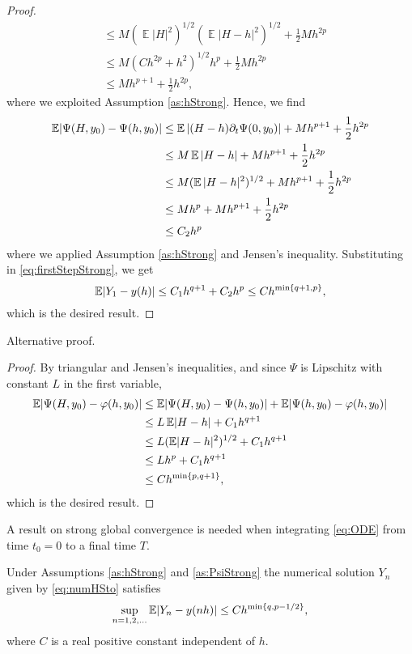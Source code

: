 \documentclass{siamart1116}
\numberwithin{theorem}{section}
\DeclarePairedDelimiter{\abs}{\lvert}{\rvert}
\renewcommand{\phi}{\varphi}
\newcommand{\E}{\operatorname{\mathbb{E}}}
\begin{document}
\begin{proof}
\begin{equation}
\begin{aligned}
	&\leq M (\E|H|^2)^{1/2}(\E|H-h|^2)^{1/2} + \frac{1}{2}Mh^{2p}\\
	&\leq M(Ch^{2p} + h^2)^{1/2}h^p + \frac{1}{2}Mh^{2p}\\
	&\leq M h^{p+1} + \frac{1}{2}h^{2p},
	\end{aligned} 
	\end{equation}
	where we exploited Assumption \ref{as:hStrong}. Hence, we find 
	\begin{equation}
	\begin{aligned}
	\E\abs{\Psi(H, y_0) - \Psi(h, y_0)} &\leq \E|(H-h)\partial_t{\Psi} (0, y_0)| + M h^{p+1} + \frac{1}{2}h^{2p} \\
	&\leq M\E|H - h| +  M h^{p+1} + \frac{1}{2}h^{2p}\\
	&\leq M(\E|H-h|^2)^{1/2} +  M h^{p+1} + \frac{1}{2}h^{2p} \\
	&\leq Mh^p + M h^{p+1} + \frac{1}{2}h^{2p} \\
	&\leq C_2 h^p
	\end{aligned}
	\end{equation}
	where we applied Assumption \ref{as:hStrong} and Jensen's inequality. Substituting in \eqref{eq:firstStepStrong}, we get
	\begin{equation}
	\E\abs{Y_1 - y(h)} \leq C_1h^{q+1} + C_2 h^{p} \leq Ch^{\min\{q+1, p\}},
	\end{equation}
	which is the desired result.
\end{proof}
\noindent Alternative proof.
\begin{proof}
	By triangular and Jensen's inequalities, and since $\Psi$ is Lipschitz with constant $L$ in the first variable,
	\begin{equation}
	\begin{aligned}
		\E\abs{\Psi(H, y_0) - \phi(h, y_0)} &\leq \E\abs{\Psi(H, y_0) - \Psi(h, y_0)} + \E\abs{\Psi(h, y_0) - \phi(h, y_0)} \\
		&\leq L \E\abs{H - h} + C_1 h^{q+1} \\
		&\leq L (\E\abs{H - h}^{2})^{1/2} + C_1 h^{q+1}\\
		&\leq L h^p + C_1 h^{q+1} \\
		&\leq C h^{\min\{p, q+1\}},
	\end{aligned}
	\end{equation}
	which is the desired result.
\end{proof}
\noindent A result on strong global convergence is needed when integrating \eqref{eq:ODE} from time $t_0 = 0$ to a final time $T$.
\begin{theorem}\label{thm:StrongOrder} Under Assumptions \ref{as:hStrong} and \ref{as:PsiStrong} the numerical solution $Y_n$ given by \eqref{eq:numHSto} satisfies 
	\begin{equation}\label{eq:StrongGlobalClaim}
	\sup_{n=1,2, \ldots} \E\abs{Y_n - y(nh)} \leq C h^{\min\{q, p-1/2\}},
	\end{equation}
	where $C$ is a real positive constant independent of $h$.
\end{theorem}
\end{document}
